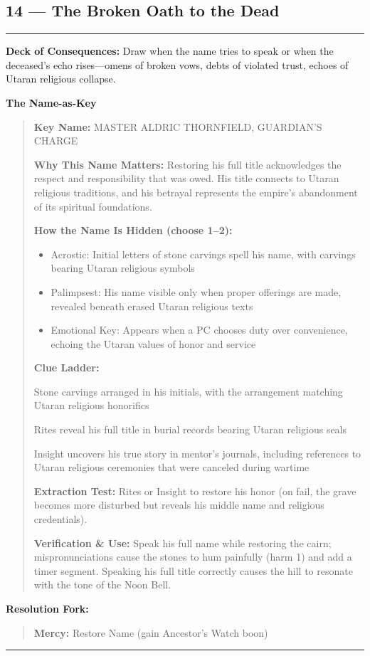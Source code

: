 \documentclass[18pt, letterpaper, twoside]{article}
\newenvironment{floorbox}[1]{%
    \begin{center}
    \begin{minipage}{0.95\textwidth}
    \subsection*{#1}
    \vspace{-0.5em}
    \rule{\textwidth}{0.5pt}
    \vspace{0.5em}
}{%
    \vspace{0.5em}
    \rule{\textwidth}{0.5pt}
    \end{minipage}
    \end{center}
}
\newenvironment{gmnote}[1]{%
    \vspace{0.5em}
    \noindent\textbf{#1}
    \begin{quote}
}{%
    \end{quote}
    \vspace{0.5em}
}
\newenvironment{resolutionbox}{%
    \vspace{0.5em}
    \noindent\textbf{Resolution Fork:}
    \begin{quote}
}{%
    \end{quote}
    \vspace{0.5em}
}
\newcommand{\deckdraw}[1]{\noindent\textbf{Deck of Consequences:} #1\par}
\newcommand{\keyname}[1]{\noindent\textbf{Key Name:} #1\par}
\newcommand{\nameimportance}[1]{\noindent\textbf{Why This Name Matters:} #1\par}
\begin{document}
\begin{floorbox}{14 --- The Broken Oath to the Dead}
\deckdraw{Draw when the name tries to speak or when the deceased's echo rises---omens of broken vows, debts of violated trust, echoes of Utaran religious collapse.}

\begin{gmnote}{The Name-as-Key}
\keyname{MASTER ALDRIC THORNFIELD, GUARDIAN'S CHARGE}
\nameimportance{Restoring his full title acknowledges the respect and responsibility that was owed. His title connects to Utaran religious traditions, and his betrayal represents the empire's abandonment of its spiritual foundations.}

\textbf{How the Name Is Hidden (choose 1--2):}
\begin{itemize}[leftmargin=*]
    \item Acrostic: Initial letters of stone carvings spell his name, with carvings bearing Utaran religious symbols
    \item Palimpsest: His name visible only when proper offerings are made, revealed beneath erased Utaran religious texts
    \item Emotional Key: Appears when a PC chooses duty over convenience, echoing the Utaran values of honor and service
\end{itemize}

\textbf{Clue Ladder:}
\begin{description}[leftmargin=*, style=unboxed]
    \item[Gentle Nudge:] Stone carvings arranged in his initials, with the arrangement matching Utaran religious honorifics
    \item[Actionable Lead:] Rites reveal his full title in burial records bearing Utaran religious seals
    \item[Aha! Proof:] Insight uncovers his true story in mentor's journals, including references to Utaran religious ceremonies that were canceled during wartime
\end{description}

\textbf{Extraction Test:} Rites or Insight to restore his honor (on fail, the grave becomes more disturbed but reveals his middle name and religious credentials).

\textbf{Verification \& Use:} Speak his full name while restoring the cairn; mispronunciations cause the stones to hum painfully (harm 1) and add a timer segment. Speaking his full title correctly causes the hill to resonate with the tone of the Noon Bell.
\end{gmnote}

\begin{resolutionbox}
\textbf{Mercy:} Restore Name (gain Ancestor's Watch boon)


\end{resolutionbox}
\end{floorbox}
\end{document}
